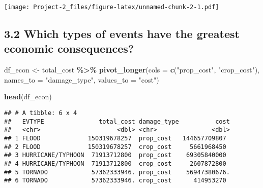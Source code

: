 \documentclass[
]{article}
\newenvironment{Shaded}{\begin{snugshade}}{\end{snugshade}}
\newcommand{\AttributeTok}[1]{\textcolor[rgb]{0.13,0.29,0.53}{#1}}
\newcommand{\FunctionTok}[1]{\textcolor[rgb]{0.13,0.29,0.53}{\textbf{#1}}}
\newcommand{\NormalTok}[1]{#1}
\newcommand{\OtherTok}[1]{\textcolor[rgb]{0.56,0.35,0.01}{#1}}
\newcommand{\SpecialCharTok}[1]{\textcolor[rgb]{0.81,0.36,0.00}{\textbf{#1}}}
\newcommand{\StringTok}[1]{\textcolor[rgb]{0.31,0.60,0.02}{#1}}
\begin{document}
\texttt{[image: Project-2\_files/figure-latex/unnamed-chunk-2-1.pdf]}

\hypertarget{which-types-of-events-have-the-greatest-economic-consequences}{%
\subsection{3.2 Which types of events have the greatest economic
consequences?}\label{which-types-of-events-have-the-greatest-economic-consequences}}

\begin{Shaded}
\begin{Highlighting}[]
\NormalTok{df\_econ }\OtherTok{\textless{}{-}}\NormalTok{ total\_cost }\SpecialCharTok{\%\textgreater{}\%}
    \FunctionTok{pivot\_longer}\NormalTok{(}\AttributeTok{cols =} \FunctionTok{c}\NormalTok{(}\StringTok{"prop\_cost"}\NormalTok{, }\StringTok{"crop\_cost"}\NormalTok{),}
                 \AttributeTok{names\_to =} \StringTok{"damage\_type"}\NormalTok{,}
                 \AttributeTok{values\_to =} \StringTok{"cost"}\NormalTok{)}

\FunctionTok{head}\NormalTok{(df\_econ)}
\end{Highlighting}
\end{Shaded}

\begin{verbatim}
## # A tibble: 6 x 4
##   EVTYPE               total_cost damage_type          cost
##   <chr>                     <dbl> <chr>               <dbl>
## 1 FLOOD             150319678257  prop_cost   144657709807 
## 2 FLOOD             150319678257  crop_cost     5661968450 
## 3 HURRICANE/TYPHOON  71913712800  prop_cost    69305840000 
## 4 HURRICANE/TYPHOON  71913712800  crop_cost     2607872800 
## 5 TORNADO            57362333946. prop_cost    56947380676.
## 6 TORNADO            57362333946. crop_cost      414953270
\end{verbatim}
\end{document}
